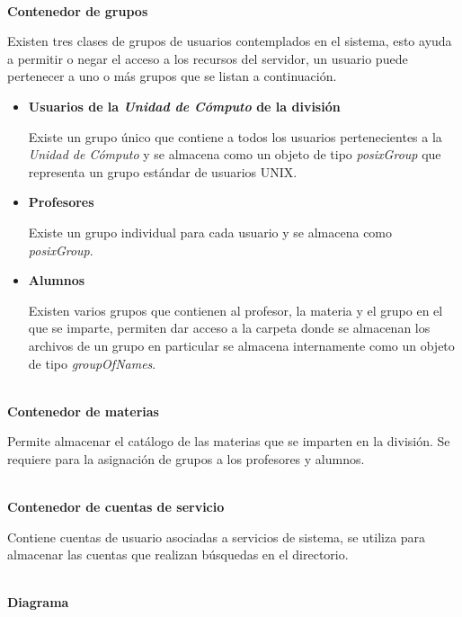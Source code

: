\textbf{\\ Contenedor de grupos \\}

Existen tres clases de grupos de usuarios contemplados en el sistema, esto ayuda a permitir o negar el acceso a los recursos del servidor, un usuario puede pertenecer a uno o m\'{a}s grupos que se listan a continuaci\'{o}n.

\begin{itemize}

  \item \textbf{Usuarios de la \textsl{Unidad de C\'{o}mputo} de la divisi\'{o}n}

  Existe un grupo \'{u}nico que contiene a todos los usuarios pertenecientes a la \textit{Unidad de C\'{o}mputo} y se almacena como un objeto de tipo \textit{posixGroup} que representa un grupo est\'{a}ndar de usuarios \textsc{UNIX}.

  \item \textbf{Profesores}

  Existe un grupo individual para cada usuario y se almacena como \textit{posixGroup}.

  \item \textbf{Alumnos}

  Existen varios grupos que contienen al profesor, la materia y el grupo en el que se imparte, permiten dar acceso a la carpeta donde se almacenan los archivos de un grupo en particular se almacena internamente como un objeto de tipo \textit{groupOfNames}.

\end{itemize}

\textbf{\\ Contenedor de materias \\}

Permite almacenar el cat\'{a}logo de las materias que se imparten en la divisi\'{o}n. Se requiere para la asignaci\'{o}n de grupos a los profesores y alumnos.

\textbf{\\ Contenedor de cuentas de servicio \\}

Contiene cuentas de usuario asociadas a servicios de sistema, se utiliza para almacenar las cuentas que realizan b\'{u}squedas en el directorio.

\textbf{\\ Diagrama \\}


